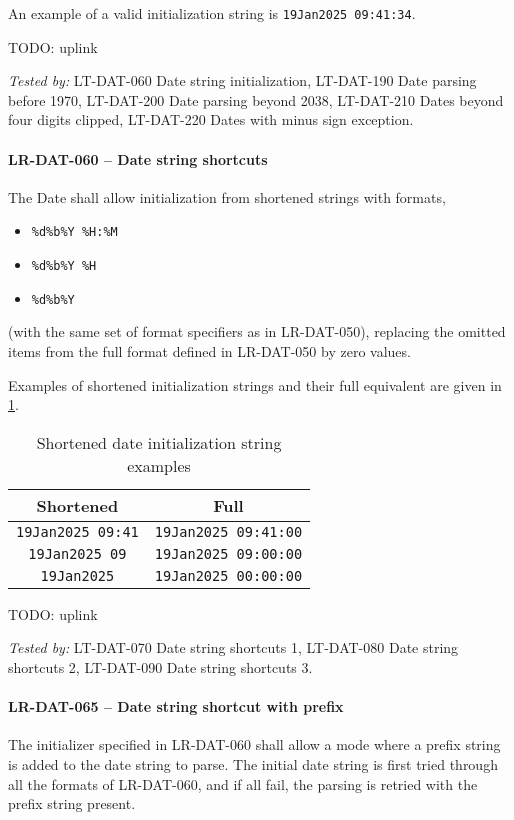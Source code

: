 An example of a valid initialization string is \lstinline {19Jan2025 09:41:34}.

TODO: uplink

\textit{Tested by: } LT-DAT-060 Date string initialization,
LT-DAT-190 Date parsing before 1970,
LT-DAT-200 Date parsing beyond 2038,
LT-DAT-210 Dates beyond four digits clipped,
LT-DAT-220 Dates with minus sign exception.

\paragraph{LR-DAT-060 -- Date string shortcuts}
The Date shall allow initialization from shortened strings
with formats,
\begin{itemize}
\item \lstinline{%d%b%Y %H:%M}
\item \lstinline{%d%b%Y %H}
\item \lstinline{%d%b%Y}
\end{itemize}
(with the same set of format specifiers as in LR-DAT-050),
replacing the omitted items from the full format defined in LR-DAT-050
by zero values.

Examples of shortened initialization strings and their full equivalent are
given in \cref{tab:date_shortened}.

\begin{table}
  \caption{\label{tab:date_shortened}
    Shortened date initialization string examples}
  \begin{tabular}{| c | c |} \hline
    \textbf{Shortened} & \textbf{Full} \\ \hline
    \texttt{19Jan2025 09:41} & \texttt{19Jan2025 09:41:00} \\ \hline
    \texttt{19Jan2025 09} & \texttt{19Jan2025 09:00:00} \\ \hline
    \texttt{19Jan2025} & \texttt{19Jan2025 00:00:00} \\ \hline
  \end{tabular}\end{table}

TODO: uplink

\textit{Tested by: } LT-DAT-070 Date string shortcuts 1,
LT-DAT-080 Date string shortcuts 2,
LT-DAT-090 Date string shortcuts 3.

\paragraph{LR-DAT-065 -- Date string shortcut with prefix}
The initializer specified in LR-DAT-060 shall allow a mode where
a prefix string is added to the date string to parse.
The initial date string is first tried through all the formats
of LR-DAT-060, and if all fail, the parsing is retried with
the prefix string present.

